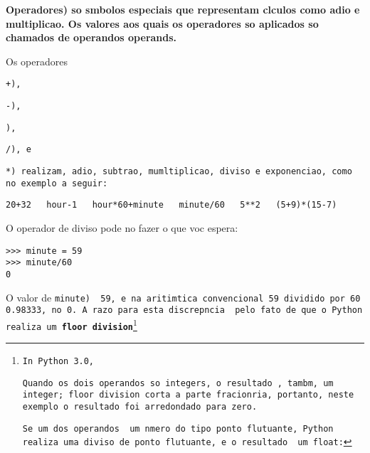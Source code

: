 {{{{{{{{{{%
{\bf Operadores) s o s mbolos especiais que representam c lculos como 
adi  o e multiplica  o. Os valores aos quais os operadores s o aplicados 
s o chamados de operandos {\bf operands}.

Os operadores {\tt +), {\tt -), {\tt *), {\tt /), e {\tt **) 
realizam, adi  o, subtra  o, mumltiplica  o, divis o 
e exponencia  o, como no exemplo a seguir:

\beforeverb
\begin{verbatim}
20+32   hour-1   hour*60+minute   minute/60   5**2   (5+9)*(15-7)
\end{verbatim}
\afterverb
%
O operador de divis o pode n o fazer o que voc  espera: 

\beforeverb
\begin{verbatim}
>>> minute = 59
>>> minute/60
0
\end{verbatim}
\afterverb
%
O valor de {\tt minute)   59, e na aritim tica convencional 59 
dividido por 60   0.98333, n o 0. A raz o para esta discrep ncia   
pelo fato de que o Python realiza um {\bf floor division}\footnote{In Python 3.0,


Quando os dois operandos s o integers, o resultado  , tamb m,
um integer; floor division corta a parte fracion ria,
portanto, neste exemplo o resultado foi arredondado para zero.

Se um dos operandos   um n mero do tipo ponto flutuante, Python realiza 
uma divis o de ponto flutuante, e o resultado   um {\tt float}:

}}}}}}}}}}}}}}}}}}
